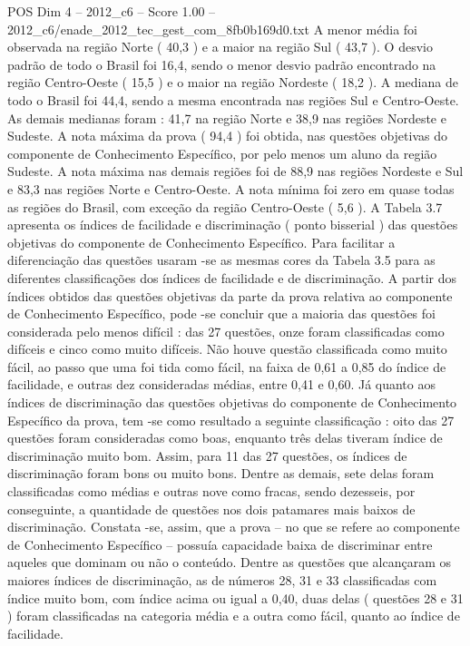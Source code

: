 \begin{textsample}{POS Dim 4 – 2012\_c6 – Score 1.00 – 2012\_c6/enade\_2012\_tec\_gest\_com\_8fb0b169d0.txt}
A menor média foi observada na região Norte ( 40,3 ) e a maior na região Sul ( 43,7 ).
O desvio padrão de todo o Brasil foi 16,4, sendo o menor desvio padrão encontrado na região Centro-Oeste ( 15,5 ) e o maior na região Nordeste ( 18,2 ).
A mediana de todo o Brasil foi 44,4, sendo a mesma encontrada nas regiões Sul e Centro-Oeste.
As demais medianas foram : 41,7 na região Norte e 38,9 nas regiões Nordeste e Sudeste.
A nota máxima da prova ( 94,4 ) foi obtida, nas questões objetivas do componente de Conhecimento Específico, por pelo menos um aluno da região Sudeste.
A nota máxima nas demais regiões foi de 88,9 nas regiões Nordeste e Sul e 83,3 nas regiões Norte e Centro-Oeste.
A nota mínima foi zero em quase todas as regiões do Brasil, com exceção da região Centro-Oeste ( 5,6 ).
A Tabela 3.7 apresenta os índices de facilidade e discriminação ( ponto bisserial ) das questões objetivas do componente de Conhecimento Específico.
Para facilitar a diferenciação das questões usaram -se as mesmas cores da Tabela 3.5 para as diferentes classificações dos índices de facilidade e de discriminação.
A partir dos índices obtidos das questões objetivas da parte da prova relativa ao componente de Conhecimento Específico, pode -se concluir que a maioria das questões foi considerada pelo menos difícil : das 27 questões, onze foram classificadas como difíceis e cinco como muito difíceis.
Não houve questão classificada como muito fácil, ao passo que uma foi tida como fácil, na faixa de 0,61 a 0,85 do índice de facilidade, e outras dez consideradas médias, entre 0,41 e 0,60.
Já quanto aos índices de discriminação das questões objetivas do componente de Conhecimento Específico da prova, tem -se como resultado a seguinte classificação : oito das 27 questões foram consideradas como boas, enquanto três delas tiveram índice de discriminação muito bom.
Assim, para 11 das 27 questões, os índices de discriminação foram bons ou muito bons.
Dentre as demais, sete delas foram classificadas como médias e outras nove como fracas, sendo dezesseis, por conseguinte, a quantidade de questões nos dois patamares mais baixos de discriminação.
Constata -se, assim, que a prova – no que se refere ao componente de Conhecimento Específico – possuía capacidade baixa de discriminar entre aqueles que dominam ou não o conteúdo.
Dentre as questões que alcançaram os maiores índices de discriminação, as de números 28, 31 e 33 classificadas com índice muito bom, com índice acima ou igual a 0,40, duas delas ( questões 28 e 31 ) foram classificadas na categoria média e a outra como fácil, quanto ao índice de facilidade.

\end{textsample}
